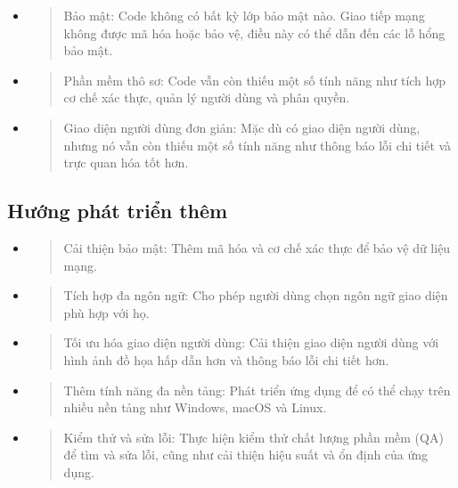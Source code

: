 \documentclass[a4paper]{article}
\begin{document}
\begin{itemize}
\item
  \begin{quote}
  Bảo mật: Code không có bất kỳ lớp bảo mật nào. Giao tiếp mạng không
  được mã hóa hoặc bảo vệ, điều này có thể dẫn đến các lỗ hổng bảo mật.
  \end{quote}
\item
  \begin{quote}
  Phần mềm thô sơ: Code vẫn còn thiếu một số tính năng như tích hợp cơ
  chế xác thực, quản lý người dùng và phân quyền.
  \end{quote}
\item
  \begin{quote}
  Giao diện người dùng đơn giản: Mặc dù có giao diện người dùng, nhưng
  nó vẫn còn thiếu một số tính năng như thông báo lỗi chi tiết và trực
  quan hóa tốt hơn.
  \end{quote}
\end{itemize}

\hypertarget{hux1b0ux1edbng-phuxe1t-triux1ec3n-thuxeam}{%
\subsection{Hướng phát triển
thêm}\label{hux1b0ux1edbng-phuxe1t-triux1ec3n-thuxeam}}

\begin{itemize}
\item
  \begin{quote}
  Cải thiện bảo mật: Thêm mã hóa và cơ chế xác thực để bảo vệ dữ liệu
  mạng.
  \end{quote}
\item
  \begin{quote}
  Tích hợp đa ngôn ngữ: Cho phép người dùng chọn ngôn ngữ giao diện phù
  hợp với họ.
  \end{quote}
\item
  \begin{quote}
  Tối ưu hóa giao diện người dùng: Cải thiện giao diện người dùng với
  hình ảnh đồ họa hấp dẫn hơn và thông báo lỗi chi tiết hơn.
  \end{quote}
\item
  \begin{quote}
  Thêm tính năng đa nền tảng: Phát triển ứng dụng để có thể chạy trên
  nhiều nền tảng như Windows, macOS và Linux.
  \end{quote}
\item
  \begin{quote}
  Kiểm thử và sửa lỗi: Thực hiện kiểm thử chất lượng phần mềm (QA) để
  tìm và sửa lỗi, cũng như cải thiện hiệu suất và ổn định của ứng dụng.
  \end{quote}
\end{itemize}
\end{document}
